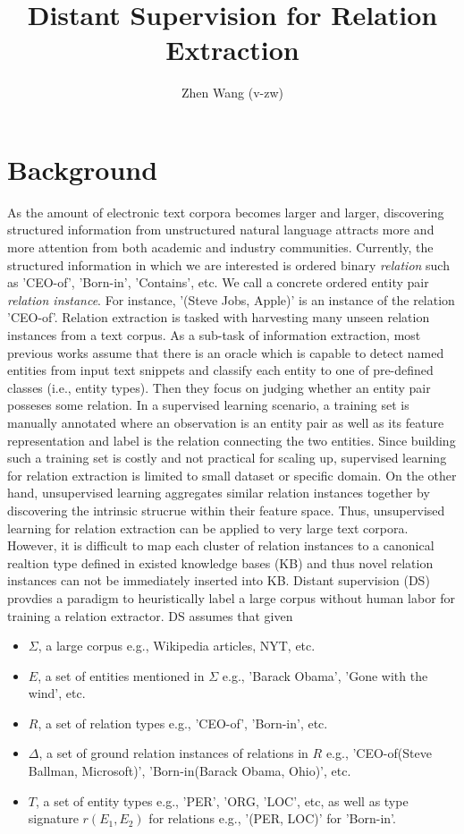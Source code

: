 \documentclass[10pt]{article} %
\title{Distant Supervision for Relation Extraction}
\author{Zhen Wang (v-zw)}
\theoremstyle{definition}
\theoremstyle{definition}
\begin{document}
\maketitle
\section{Background}
As the amount of electronic text corpora becomes larger and larger, discovering structured information from unstructured natural language attracts more and more attention from both academic and industry communities. 
Currently, the structured information in which we are interested is ordered binary \emph{relation} such as 'CEO-of', 'Born-in', 'Contains', etc. 
We call a concrete ordered entity pair \emph{relation instance}. 
For instance, '(Steve Jobs, Apple)' is an instance of the relation 'CEO-of'. 
Relation extraction is tasked with harvesting many unseen relation instances from a text corpus. 
As a sub-task of information extraction, most previous works assume that there is an oracle which is capable to detect named entities from input text snippets and classify each entity to one of pre-defined classes (i.e., entity types). 
Then they focus on judging whether an entity pair posseses some relation. 
In a supervised learning scenario, a training set is manually annotated where an observation is an entity pair as well as its feature representation and label is the relation connecting the two entities. 
Since building such a training set is costly and not practical for scaling up, supervised learning for relation extraction is limited to small dataset or specific domain. 
On the other hand, unsupervised learning aggregates similar relation instances together by discovering the intrinsic strucrue within their feature space. 
Thus, unsupervised learning for relation extraction can be applied to very large text corpora. 
However, it is difficult to map each cluster of relation instances to a canonical realtion type defined in existed knowledge bases (KB) and thus novel relation instances can not be immediately inserted into KB. 
Distant supervision (DS)~\cite{mintz} provdies a paradigm to heuristically label a large corpus without human labor for training a relation extractor. 
DS assumes that given 
\begin{itemize}
\item $\Sigma$, a large corpus e.g., Wikipedia articles, NYT, etc. 
\item $E$, a set of entities mentioned in $\Sigma$ e.g., 'Barack Obama', 'Gone with the wind', etc. 
\item $R$, a set of relation types e.g., 'CEO-of', 'Born-in', etc. 
\item $\Delta$, a set of ground relation instances of relations in $R$ e.g., 'CEO-of(Steve Ballman, Microsoft)', 'Born-in(Barack Obama, Ohio)', etc. 
\item $T$, a set of entity types e.g., 'PER', 'ORG, 'LOC', etc, as well as type signature $r(E_1,E_2)$ for relations e.g., '(PER, LOC)' for 'Born-in'. 
\end{itemize}
\end{document}
